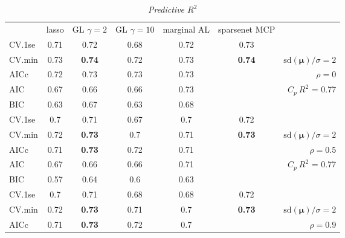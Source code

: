 \documentclass[12pt]{article}
\newcommand{\mr}[1]{\mathrm{#1}}
\newcommand{\bm}[1]{\mathbf{#1}}
\begin{document}

\begin{table}[p]\vspace{-.5cm}
\caption[l]{\label{r2}\it Predictive $R^2$\hfill}
\vspace{-.5cm}
\small{}
\begin{center}
\begin{tabular}{l*{5}{c}|r}
 & lasso & GL $\gamma=2$ & GL $\gamma=10$ & marginal AL & sparsenet MCP  &  \\
\cline{1-7}
CV.1se & 0.71 & 0.72 & 0.68 & 0.72 & 0.73 &\\
CV.min & 0.73 & {\bf 0.74} & 0.72 & 0.73 & {\bf 0.74} &  $\mr{sd}(\bm{\mu})/\sigma=2$ \\
AICc & 0.72 & 0.73 & 0.73 & 0.73 & & $\rho=0$ \\
AIC & 0.67 & 0.66 & 0.66 & 0.73 & & \multirow{2}{*}{$C_p ~ R^2$ = 0.77} \\
BIC & 0.63 & 0.67 & 0.63 & 0.68 & & \\
 \hline 
CV.1se & 0.7 & 0.71 & 0.67 & 0.7 & 0.72 &\\
CV.min & 0.72 & {\bf 0.73} & 0.7 & 0.71 & {\bf 0.73} &  $\mr{sd}(\bm{\mu})/\sigma=2$ \\
AICc & 0.71 & {\bf 0.73} & 0.72 & 0.71 & & $\rho=0.5$ \\
AIC & 0.67 & 0.66 & 0.66 & 0.71 & & \multirow{2}{*}{$C_p ~ R^2$ = 0.77} \\
BIC & 0.57 & 0.64 & 0.6 & 0.63 & & \\
 \hline 
CV.1se & 0.7 & 0.71 & 0.68 & 0.68 & 0.72 &\\
CV.min & 0.72 & {\bf 0.73} & 0.71 & 0.7 & {\bf 0.73} &  $\mr{sd}(\bm{\mu})/\sigma=2$ \\
AICc & 0.71 & {\bf 0.73} & 0.72 & 0.7 & & $\rho=0.9$ \\

\end{tabular}
\end{center}
\end{table}
\end{document}

